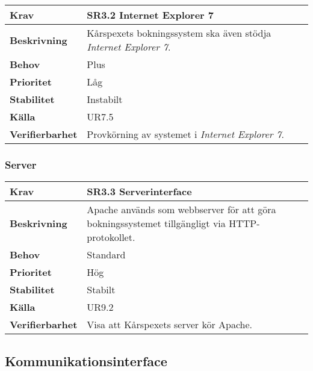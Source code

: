 \documentclass[a4paper, twoside, 11pt, titlepage]{article}
\begin{document}
		\begin{tabular} { p{2.6cm} p{12.5cm} }
			\hline
			\sffamily\textbf{Krav} & \sffamily\textbf{SR3.2 Internet Explorer 7 } \\
			\hline
			\sffamily\textbf{Beskrivning} & Kårspexets bokningssystem ska även stödja \emph{Internet Explorer 7}.  \\
			\hline
			\sffamily\textbf{Behov} & Plus  \\
			\hline
			\sffamily\textbf{Prioritet} & Låg  \\
			\hline
			\sffamily\textbf{Stabilitet} & Instabilt  \\
			\hline
			\sffamily\textbf{Källa} & UR7.5  \\
			\hline
			\sffamily\textbf{Verifierbarhet} & Provkörning av systemet i \emph{Internet Explorer 7}.  \\
			\hline
		\end{tabular}


		\subsubsection{Server}


		\begin{tabular} { p{2.6cm} p{12.5cm} }
			\hline
			\sffamily\textbf{Krav} & \sffamily\textbf{SR3.3 Serverinterface } \\
			\hline
			\sffamily\textbf{Beskrivning} & Apache används som webbserver för att göra bokningssystemet tillgängligt via HTTP-protokollet.  \\
			\hline
			\sffamily\textbf{Behov} & Standard  \\
			\hline
			\sffamily\textbf{Prioritet} & Hög  \\
			\hline
			\sffamily\textbf{Stabilitet} & Stabilt  \\
			\hline
			\sffamily\textbf{Källa} & UR9.2  \\
			\hline
			\sffamily\textbf{Verifierbarhet} & Visa att Kårspexets server kör Apache.  \\
			\hline
		\end{tabular}


	\subsection{Kommunikationsinterface}
\end{document}

